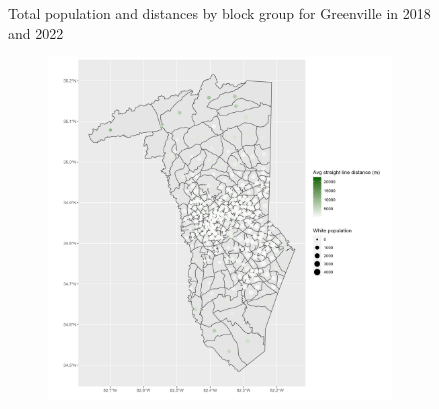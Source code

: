 \documentclass[11pt]{article}
\theoremstyle{remark}
\theoremstyle{definition}
\begin{document}
\begin{figure}
\begin{subfigure}{.5\textwidth}
		\label{sfig:Greenville_2022_bg_dist}
	\end{subfigure}
	\caption{Total population and distances by block group for Greenville in 2018 and 2022}
	\label{fig:Greenville distance Total population maps}
\end{figure}

\begin{figure}
	\begin{subfigure}{.5\textwidth}
		\centering
		\includegraphics[width=\linewidth]{result analysis/Greenville_SC_original_configs/white_pop_and_dist_Greenville_config_original_2018_polls.png}
		\label{sfig:York_2018_bg_dist_pop}
	\end{subfigure} 
	\begin{subfigure}{.5\textwidth}
		\centering

\end{subfigure}
\end{figure}
\end{document}
